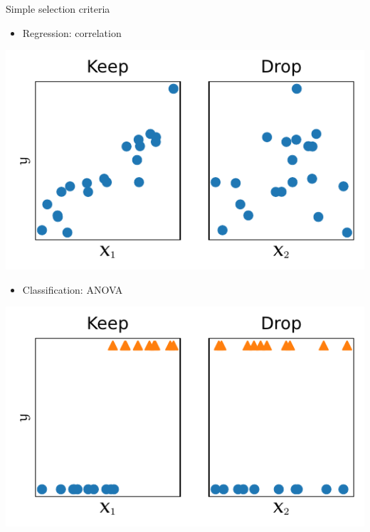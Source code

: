 \documentclass[presentation,mathserif,table]{beamer}
\begin{document}
\begin{frame}[label={sec:org0172973}]{Simple selection criteria}
\begin{itemize}
\item Regression: correlation
\end{itemize}

\begin{center}
\includegraphics[height=.4 \textheight]{figures/generated/univariate_selection/regression.pdf}
\end{center}
\begin{itemize}
\item Classification: ANOVA
\end{itemize}
\vspace{-2pt}
\begin{center}
\includegraphics[height=.4 \textheight]{figures/generated/univariate_selection/classification.pdf}
\end{center}
\end{frame}
\end{document}
